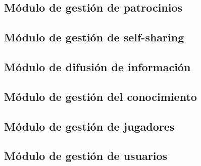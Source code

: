 \subsection{Módulo de gestión de patrocinios}


\clearpage

\subsection{Módulo de gestión de self-sharing}


\subsection{Módulo de difusión de información}


\subsection{Módulo de gestión del conocimiento}


\subsection{Módulo de gestión de jugadores}


\subsection{Módulo de gestión de usuarios}
